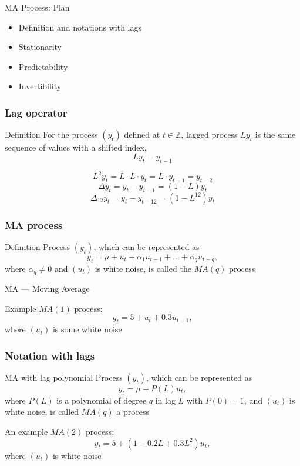 
\begin{frame} %


\end{frame}



\begin{frame}{MA Process: Plan}
	\begin{itemize}[<+->]
		\item Definition and notations with lags
		\item Stationarity
		\item Predictability
		\item Invertibility
	\end{itemize}
	
\end{frame}

\begin{frame}
	\frametitle{Lag operator}
	
	\begin{block}{Definition}
		For the process $(y_t)$ defined at $t \in \mathbb{Z}$, \alert{lagged} process
		$L y_t$ is the same sequence of values ​​with a shifted index,
		\[
		L y_t = y_{t-1}
		\]
	\end{block}
	
	\pause
	\[
	L^2 y_t = L\cdot L\cdot y_t = L\cdot y_{t-1} = y_{t-2}
	\]
	\pause
	\[
	\Delta y_t = y_t - y_{t-1} = (1 - L) y_t
	\]
	\pause
	\[
	\Delta_{12} y_t = y_t - y_{t-12} = (1 - L^{12}) y_t
	\]
\end{frame}

\begin{frame}
	\frametitle{MA process}
	
	\begin{block}{Definition}
		Process $(y_t)$, which \alert{can} be represented as
		\[
		y_t = \mu + u_t + \alpha_1 u_{t-1} + \ldots + \alpha_q u_{t-q},
		\]
		where $\alpha_q \neq 0$ and $(u_t)$ is white noise, is called the $MA(q)$ process
	\end{block}

	\alert{MA — Moving Average}
	
	
	\pause
	Example $MA(1)$ process:
	\[
	y_t = 5 + u_t + 0.3 u_{t-1},
	\]
	where $(u_t)$ is some white noise

	
\end{frame}


\begin{frame}
	\frametitle{Notation with lags}
	
	\begin{block}{MA with lag polynomial}
		Process $(y_t)$, which \alert{can} be represented as
		\[
		y_t = \mu + P(L) u_t,
		\]
		where $P(L)$ is a polynomial of degree $q$ in lag $L$ with $P(0)=1$, and $(u_t)$ is white noise,
		is called $MA(q)$ a process
	\end{block}
	
	\pause
	An example $MA(2)$ process:
	\[
	y_t = 5 + (1 - 0.2 L + 0.3 L^2) u_t,
	\]
	where $(u_t)$ is white noise
\end{frame}





